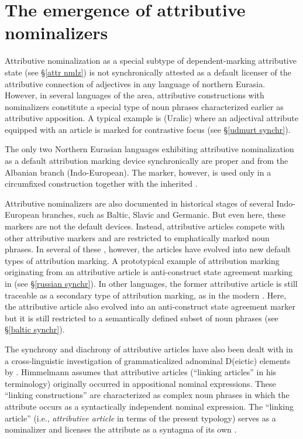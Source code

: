 \section[Attributive nominalizers]{The emergence of attributive nominalizers}
Attributive nominalization as a special subtype of dependent\hyp{}marking attributive state (see \S\ref{attr nmlz}) is not synchronically attested as a default licenser of the attributive connection of adjectives in any language of northern Eurasia. However, in several languages of the area, attributive constructions with nominalizers constitute a special type of noun phrases characterized earlier as attributive apposition. A typical example is  (Uralic) where an adjectival attribute equipped with an article is marked for contrastive focus (see \S\ref{udmurt synchr}).

The only two Northern Eurasian languages exhibiting attributive nominalization as a default attribution marking device synchronically are  proper and  from the Albanian branch (Indo-European). The marker, however, is used only in a circumfixed construction together with the inherited .

Attributive nominalizers are also documented in historical stages of several Indo-European branches, such as Baltic, Slavic and Germanic. But even here, these markers are not the default devices. Instead, attributive articles compete with other attributive markers and are restricted to emphatically marked noun phrases. In several of these , however, the articles have evolved into new default types of attribution marking. A prototypical example of attribution marking originating from an attributive article is anti\hyp{}construct state agreement marking in  (see \S\ref{russian synchr}). In other languages, the former attributive article is still traceable as a secondary type of attribution marking, as in the modern . Here, the attributive article also evolved into an anti\hyp{}construct state agreement marker but it is still restricted to a semantically defined subset of noun phrases (see \S\ref{baltic synchr}). 

The synchrony and diachrony of attributive articles have also been dealt with in a cross-linguistic investigation of grammaticalized adnominal D(eictic) elements by \citet{himmelmann1997}. Himmelmann assumes that attributive articles (“linking articles” in his terminology) originally occurred in appositional nominal expressions. These “linking constructions” are characterized as complex noun phrases in which the attribute occurs as a syntactically independent nominal expression. The “linking article” (i.e., \textit{attributive article} in terms of the present typology) serves as a nominalizer and licenses the attribute as a syntagma of its own \citep[188]{himmelmann1997}.

